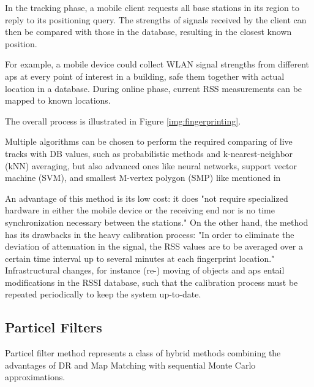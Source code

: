 In the tracking phase, a mobile client requests all base stations in its region to reply to its positioning query. The strengths of signals received by the client can then be compared with those in the database, resulting in the closest known position.

For example, a mobile device could collect WLAN signal strengths from different \ac{ap}s at every point of interest in a building, safe them together with actual location in a database. During online phase, current RSS measurements can be mapped to known locations.

The overall process is illustrated in Figure \ref{img:fingerprinting}.


Multiple algorithms can be chosen to perform the required comparing of live tracks with DB values, such as probabilistic methods and k-nearest-neighbor (kNN) averaging, but also advanced ones like neural networks, support vector machine (SVM), and smallest M-vertex polygon (SMP) like mentioned in \cite[p. 4f]{wirelessILSystemsAndTechniquesSurvey} 

An advantage of this method is its low cost: it does "not require specialized hardware in either the mobile device or the receiving end nor is no time synchronization necessary between the stations." \cite{recentAdvances} On the other hand, the method has its drawbacks in the heavy calibration process: "In order to eliminate the deviation of attenuation in the	signal, the RSS values are to be averaged over a certain time interval up to several minutes at each fingerprint location." \cite{recentAdvances} Infrastructural changes, for instance  (re-) moving of objects and \ac{ap}s entail modifications in the RSSI database, such that the calibration process must be repeated periodically to keep the system up-to-date.



\subsection{Particel Filters}
Particel filter method represents a class of hybrid methods combining the advantages of DR and Map Matching with sequential Monte Carlo approximations.\cite{particleFilter}\\

